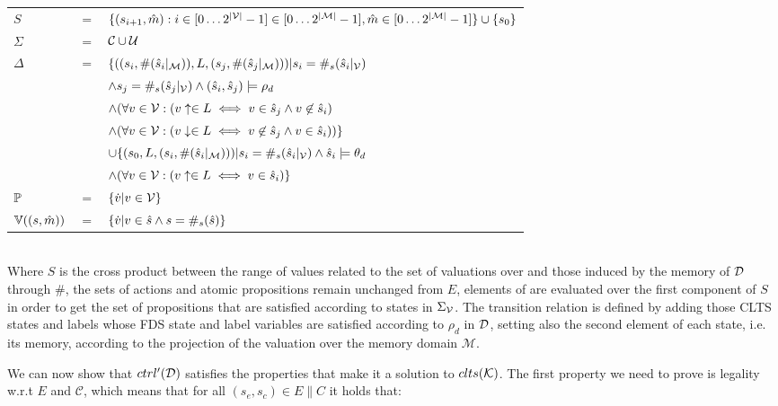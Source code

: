 \vspace{1em}
\begin{tabular}{ l c l }
	$S$ &$=$& $\{(s_{i+1},\hat{m}) : i \in [0\ldots2^{|{\mathcal{V}}|}-1] \in [0\ldots2^{|\mathcal{M}|}-1], \hat{m} \in [0\ldots2^{|\mathcal{M}|}-1] \}\cup\{s_0\}$\\
	$\Sigma$ &$=$&$\mathcal{C} \cup \mathcal{U}$\\	
	$\Delta$&$=$&$\{((s_i,\#(\hat{s}_i|_{\mathcal{M}})),L,(s_j,\#(\hat{s}_j|_{\mathcal{M}}))) | s_i = \#_s(\hat{s}_i|_{{\mathcal{V}}})$\\
	&&$\wedge  s_j = \#_s(\hat{s}_j|_{{\mathcal{V}}}) \wedge (\hat{s}_i, \hat{s}_j) \models \rho_d$\\
	&&$\wedge (\forall v \in {\ensuremath{\mathcal{V}}}: (v\uparrow \in L \iff v \in \hat{s}_j \wedge v \not\in \hat{s}_i)$\\
	&&$\wedge (\forall v \in {\ensuremath{\mathcal{V}}}: (v\downarrow \in L \iff v \not\in \hat{s}_j \wedge v \in \hat{s}_i))\}$\\
	&&$\cup \{ (s_0,L,(s_i,\#(\hat{s}_i|_{\mathcal{M}})))| s_i = \#_s(\hat{s}_i|_{{\mathcal{V}}}) \wedge \hat{s}_i \models \theta_d$\\
	&&$\wedge (\forall v \in {\ensuremath{\mathcal{V}}}: (v\uparrow \in L \iff v \in \hat{s}_i)\}$\\
	$\mathbb{P}$&$=$&$\{\dot{v} | v \in {\ensuremath{\mathcal{V}}}\}$\\
	$\mathbb{V}((s,\hat{m}))$&$=$&$\{\dot{v}| v \in \hat{s} \wedge s = \#_s(\hat{s})\}$\\
\end{tabular}
\vspace{1em}
\\
Where $S$ is the cross product between the range of values related to the set of valuations over \gsV and those induced by the memory of $\mathcal{D}$ through $\#$, the sets of actions and atomic propositions remain unchanged from $E$, elements of \valuations are evaluated over the first component of $S$ in order to get the set of propositions that are satisfied according to states in $\Sigma_{{\mathcal{V}}}$. The transition relation is defined by adding those CLTS states and labels whose FDS state and label variables are satisfied according to $\rho_d$ in $\mathcal{D}$, setting also the second element of each state, i.e. its memory, according to the projection of the valuation over the memory domain $\mathcal{M}$. 

We can now show that $ctrl'(\mathcal{D})$ satisfies the properties that make it a solution to $clts(\mathcal{K})$. The first property we need to prove is legality w.r.t $E$ and $\mathcal{C}$, which means that for all $(s_e,s_c) \in E \parallel C$ it holds that:\\


